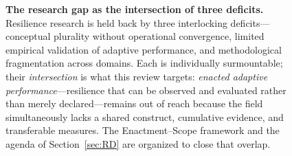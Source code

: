 \begin{figure}[t]
\centering
{}
\caption{\textbf{The research gap as the intersection of three deficits.}
Resilience research is held back by three interlocking deficits---conceptual
plurality without operational convergence, limited empirical validation of
adaptive performance, and methodological fragmentation across domains. Each is
individually surmountable; their \emph{intersection} is what this review
targets: \emph{enacted adaptive performance}---resilience that can be observed
and evaluated rather than merely declared---remains out of reach because the
field simultaneously lacks a shared construct, cumulative evidence, and
transferable measures. The Enactment--Scope framework and the agenda of
Section~\ref{sec:RD} are organized to close that overlap.}
\label{fig:venn_gaps}
\end{figure}
